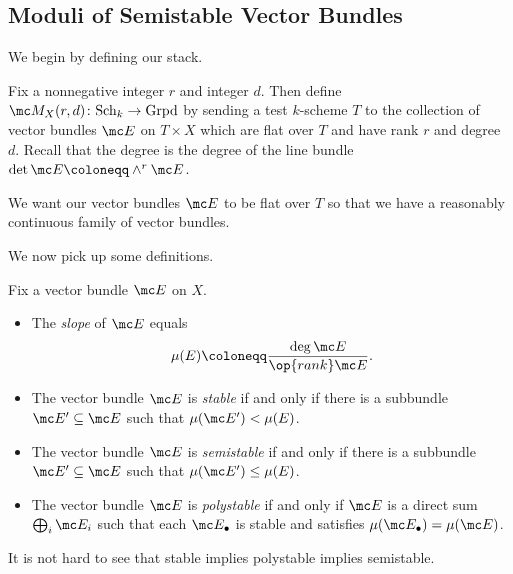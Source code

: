 \documentclass{article}
\begin{document}
\subsection{Moduli of Semistable Vector Bundles}
We begin by defining our stack.
\begin{definition}
    Fix a nonnegative integer $r$ and integer $d$. Then define $\mc M_X(r,d)\colon\mathrm{Sch}_k\to\mathrm{Grpd}$ by sending a test $k$-scheme $T$ to the collection of vector bundles $\mc E$ on $T\times X$ which are flat over $T$ and have rank $r$ and degree $d$. Recall that the degree is the degree of the line bundle $\det\mc E\coloneqq\land^r\mc E$.
\end{definition}
\begin{remark}
    We want our vector bundles $\mc E$ to be flat over $T$ so that we have a reasonably continuous family of vector bundles.
\end{remark}
We now pick up some definitions.
\begin{definition}
    Fix a vector bundle $\mc E$ on $X$.
    \begin{itemize}
        \item The \textit{slope} of $\mc E$ equals
        \[\mu(E)\coloneqq\frac{\deg\mc E}{\op{rank}\mc E}.\]
        \item The vector bundle $\mc E$ is \textit{stable} if and only if there is a subbundle $\mc E'\subseteq\mc E$ such that $\mu(\mc E')<\mu (E)$.
        \item The vector bundle $\mc E$ is \textit{semistable} if and only if there is a subbundle $\mc E'\subseteq\mc E$ such that $\mu(\mc E')\le\mu (E)$.
        \item The vector bundle $\mc E$ is \textit{polystable} if and only if $\mc E$ is a direct sum $\bigoplus_i\mc E_i$ such that each $\mc E_\bullet$ is stable and satisfies $\mu(\mc E_\bullet)=\mu(\mc E)$.
    \end{itemize}
\end{definition}
It is not hard to see that stable implies polystable implies semistable.
\end{document}
